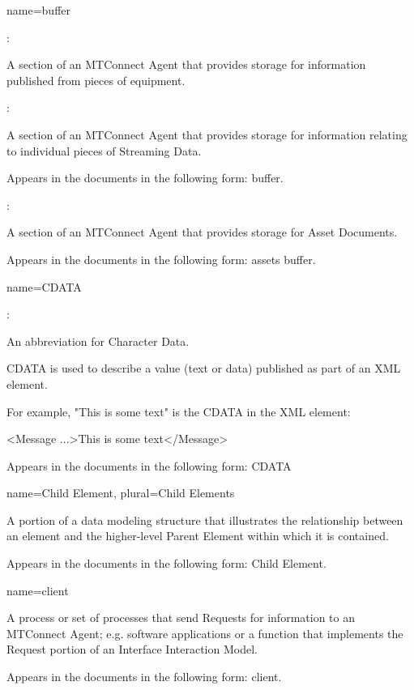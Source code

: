 {
  name={buffer}
}
{
  :

  A section of an MTConnect Agent that provides storage for information published from pieces of equipment.

  :

  A section of an MTConnect Agent that provides storage for information relating to individual pieces of Streaming Data. 
  
  Appears in the documents in the following form: buffer.

  :

  A section of an MTConnect Agent that provides storage for Asset Documents.

  Appears in the documents in the following form: assets buffer.
}

{
  name={CDATA}
}
{
  :

  An abbreviation for Character Data.

  CDATA is used to describe a value (text or data) published as part of an XML element.

  For example, "This is some text" is the CDATA in the XML element:
  
  <Message ...>This is some text</Message>

  Appears in the documents in the following form: CDATA
}


{
  name={Child Element},
  plural={Child Elements}
}
{
  A portion of a data modeling structure that illustrates the relationship between an element and the higher-level Parent Element within which it is contained.
  
  Appears in the documents in the following form: Child Element.
}


{
  name={client}
}
{
  A process or set of processes that send Requests for information to an MTConnect Agent; e.g. software applications or a function that implements the Request portion of an Interface Interaction Model.

  Appears in the documents in the following form: client.
}

